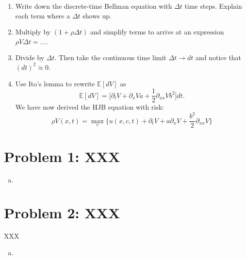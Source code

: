 \documentclass[11pt]{extarticle}
\theoremstyle{plain}
\theoremstyle{definition}
\begin{document}
\begin{enumerate}
\item Write down the discrete-time Bellman equation with $\Delta t$ time steps. Explain each term where a $\Delta t$ shows up. 

\item Multiply by $(1 + \rho \Delta t)$ and simplify terms to arrive at an expression $\rho V \Delta t = \ldots$. 

\item Divide by $\Delta t$. Then take the continuous time limit $\Delta t \to dt$ and notice that $(dt)^2 \approx 0$. 

\item Use Ito's lemma to rewrite $\mathbb E[dV]$ as 
\begin{equation*}
	\mathbb E[dV] = \bigg[ \partial_t V + \partial_x V a + \frac{1}{2} \partial_{xx} V b^2 \bigg] dt.
\end{equation*}
We have now derived the HJB equation with risk:
\begin{equation*}
		\rho V(x, t) = \max_c \bigg\{ u(x, c, t) + \partial_t V + a \partial_x V + \frac{b^2}{2} \partial_{xx} V \bigg\}
\end{equation*}

\end{enumerate}

\vspace{10mm}
\section*{Problem 1: XXX}

\begin{enumerate}[(a)]
\item 

\end{enumerate}


\vspace{10mm}
\section*{Problem 2: XXX}

XXX

\begin{enumerate}[(a)]
\item 

\end{enumerate}
\end{document}
